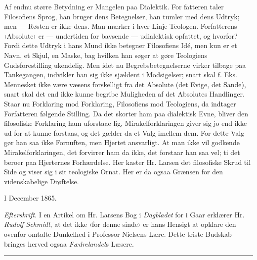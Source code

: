 \documentclass[12pt,a4paper,openany]{book}
\newcommand{\piecerule}{\par\begin{center}\rule{1.5cm}{0.4pt}\end{center}\par}
\begin{document}
Af endnu større Betydning er Mangelen paa Dialektik. For\-%
fatteren taler Filosofiens Sprog, han bruger dens Betegnelser, han
tumler med dens Udtryk; men --- Røsten er ikke dens. Man mærker
i hver Linje Teologen. Forfatterens ‹Absolute› er --- undertiden for\-%
bavsende --- udialektisk opfattet, og hvorfor? Fordi dette Udtryk
i hans Mund ikke betegner Filosofiens Idé, men kun er et Navn,
et Skjul, en Maske, bag hvilken han søger at gøre Teologiens
Gudsforestilling ukendelig. Men idet nu Begrebsbetegnelserne
virker tilbage paa Tankegangen, indvikler han sig ikke sjældent
i Modsigelser; snart skal f. Eks. Mennesket ikke være væsens\-%
forskelligt fra det Absolute (det Evige, det Sande), snart skal det end
ikke kunne begribe Muligheden af det Absolutes Handlinger. Staar
nu Forklaring mod Forklaring, Filosofiens mod Teologiens, da
indtager Forfatteren følgende Stilling. Da det skorter ham paa
dialektisk Evne, bliver den filosofiske Forklaring ham uforstaae\-%
lig, Mirakelforklaringen giver sig jo end ikke ud for at kunne
forstaas, og det gælder da et Valg imellem dem. For dette
Valg gør han saa ikke Fornuften, men Hjertet ansvarligt. At
man ikke vil godkende Mirakelforklaringen, det forvirrer ham da
ikke, det forstaar han saa vel; ti det beroer paa Hjerternes
Forhærdelse. Her kaster Hr. Larsen det filosofiske Skrud til Side
og viser sig i sit teologiske Ornat. Her er da ogsaa Grænsen for
den videnskabelige Drøftelse.

I December 1865.

\emph{Efterskrift}. I en Artikel om Hr. Larsens Bog i \emph{Dagbladet}
for i Gaar erklærer Hr. \emph{Rudolf Schmidt}, at det ikke ‹for denne\-%
sinde› er hans Hensigt at opklare den ovenfor omtalte Dunkelhed
i Professor Nielsens Lære. Dette triste Budskab bringes herved
ogsaa \emph{Fædrelandet}s Læsere.
\piecerule
\end{document}
